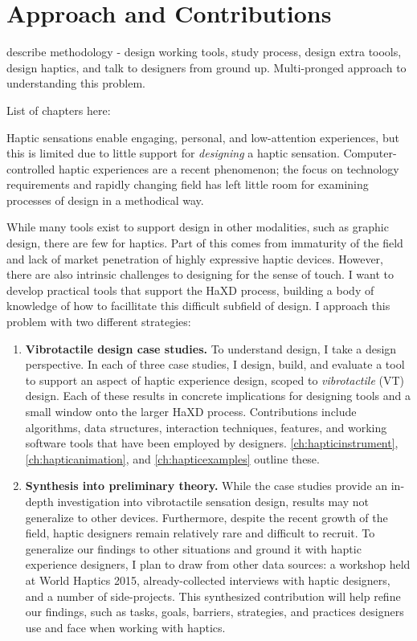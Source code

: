 \section{Approach and Contributions}
describe methodology - design working tools, study process, design extra toools, design haptics, and talk to designers from ground up.
Multi-pronged approach to understanding this problem.

List of chapters here:



Haptic sensations enable engaging, personal, and low-attention experiences, but this is limited due to little support for \emph{designing} a haptic sensation.
Computer-controlled haptic experiences are a recent phenomenon; the focus on technology requirements and rapidly changing field has left little room for examining processes of design in a methodical way.

While many tools exist to support design in other modalities, such as graphic design, there are few for haptics.
Part of this comes from immaturity of the field and lack of market penetration of highly expressive haptic devices.
However, there are also intrinsic challenges to designing for the sense of touch.
I want to develop practical tools that support the HaXD process, building a body of knowledge of how to facillitate this difficult subfield of design.
I approach this problem with two different strategies:
\begin{enumerate}
\item \textbf{Vibrotactile design case studies.}
To understand design, I take a design perspective.
In each of three case studies, I design, build, and evaluate a tool to support an aspect of haptic experience design, scoped to \emph{vibrotactile} (VT) design.
Each of these results in concrete implications for designing tools and a small window onto the larger HaXD process.
Contributions include algorithms, data structures, interaction techniques, features, and working software tools that have been employed by designers.
\autoref{ch:hapticinstrument}, \autoref{ch:hapticanimation}, and \autoref{ch:hapticexamples} outline these.

\item \textbf{Synthesis into preliminary theory.}
While the case studies provide an in-depth investigation into vibrotactile sensation design, results may not generalize to other devices.
Furthermore, despite the recent growth of the field, haptic designers remain relatively rare and difficult to recruit.
To generalize our findings to other situations and ground it with haptic experience designers, I plan to draw from other data sources: a workshop held at World Haptics 2015, already-collected interviews with haptic designers, and a number of side-projects.
This synthesized contribution will help refine our findings, such as tasks, goals, barriers, strategies, and practices designers use and face when working with haptics.
\end{enumerate}


